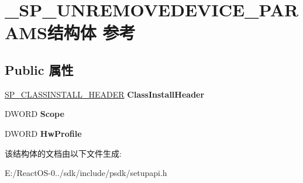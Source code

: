 \hypertarget{struct___s_p___u_n_r_e_m_o_v_e_d_e_v_i_c_e___p_a_r_a_m_s}{}\section{\+\_\+\+S\+P\+\_\+\+U\+N\+R\+E\+M\+O\+V\+E\+D\+E\+V\+I\+C\+E\+\_\+\+P\+A\+R\+A\+M\+S结构体 参考}
\label{struct___s_p___u_n_r_e_m_o_v_e_d_e_v_i_c_e___p_a_r_a_m_s}
\subsection*{Public 属性}
\begin{DoxyCompactItemize}
\item 
\mbox{\label{struct___s_p___u_n_r_e_m_o_v_e_d_e_v_i_c_e___p_a_r_a_m_s_a55ff2939906998aa81e179658e1534b2}} 
\hyperlink{struct___s_p___c_l_a_s_s_i_n_s_t_a_l_l___h_e_a_d_e_r}{S\+P\+\_\+\+C\+L\+A\+S\+S\+I\+N\+S\+T\+A\+L\+L\+\_\+\+H\+E\+A\+D\+ER} {\bfseries Class\+Install\+Header}
\item 
\mbox{\label{struct___s_p___u_n_r_e_m_o_v_e_d_e_v_i_c_e___p_a_r_a_m_s_af19a24056dc7cff51e70ba93e2e1e116}} 
D\+W\+O\+RD {\bfseries Scope}
\item 
\mbox{\label{struct___s_p___u_n_r_e_m_o_v_e_d_e_v_i_c_e___p_a_r_a_m_s_a126f0f226aa65c987d8fe4a0cbe47ad4}} 
D\+W\+O\+RD {\bfseries Hw\+Profile}
\end{DoxyCompactItemize}


该结构体的文档由以下文件生成\+:\begin{DoxyCompactItemize}
\item 
E\+:/\+React\+O\+S-\/0../sdk/include/psdk/setupapi.\+h\end{DoxyCompactItemize}
